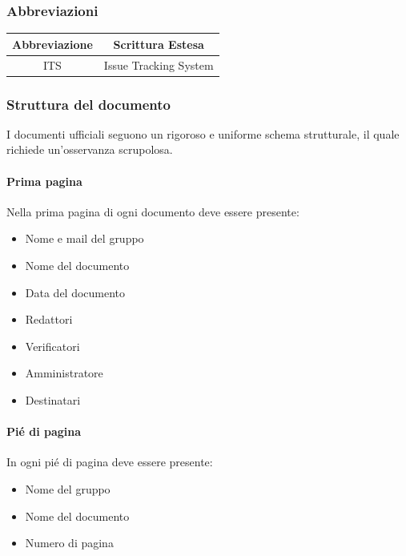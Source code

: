 \documentclass{article}
\begin{document}
    \subsubsection{Abbreviazioni}
    \begin{tabular}{|c|c|}
  \hline
  \textbf{Abbreviazione} & \textbf{Scrittura Estesa} \\
  \hline
  ITS & Issue Tracking System \\
  \hline
\end{tabular}

\subsubsection{Struttura del documento}
I documenti ufficiali seguono un rigoroso e uniforme schema strutturale, il quale richiede un'osservanza scrupolosa.
\paragraph{Prima pagina}
Nella prima pagina di ogni documento deve essere presente:
\begin{itemize}
    \item Nome e mail del gruppo
    \item Nome del documento 
    \item Data del documento
    \item Redattori
    \item Verificatori
    \item Amministratore
    \item Destinatari
\end{itemize}
\paragraph{Pié di pagina}
In ogni pié di pagina deve essere presente:
\begin{itemize}
    \item Nome del gruppo
    \item Nome del documento 
    \item Numero di pagina
\end{itemize}
\end{document}
